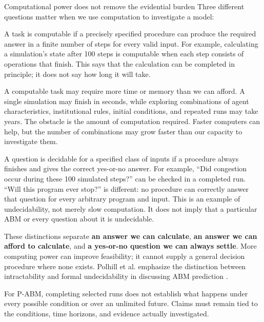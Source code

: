 \documentclass[11pt,a4paper]{article}
\begin{document}
\begin{principle}{Computational power does not remove the evidential burden}
Three different questions matter when we use computation to investigate a model:

\begin{description}[style=nextline,leftmargin=0pt,itemsep=5pt]
\item[Computability: can a procedure calculate the answer?]
A task is computable if a precisely specified procedure can produce the required answer in a finite number of steps for every valid input. For example, calculating a simulation's state after 100 steps is computable when each step consists of operations that finish. This says that the calculation can be completed in principle; it does not say how long it will take.

\item[Tractability: can we obtain the answer with feasible resources?]
A computable task may require more time or memory than we can afford. A single simulation may finish in seconds, while exploring combinations of agent characteristics, institutional rules, initial conditions, and repeated runs may take years. The obstacle is the amount of computation required. Faster computers can help, but the number of combinations may grow faster than our capacity to investigate them.

\item[Decidability: can a procedure always settle a yes-or-no question?]
A question is decidable for a specified class of inputs if a procedure always finishes and gives the correct yes-or-no answer. For example, ``Did congestion occur during these 100 simulated steps?'' can be checked in a completed run. ``Will this program ever stop?'' is different: no procedure can correctly answer that question for every arbitrary program and input. This is an example of undecidability, not merely slow computation. It does not imply that a particular ABM or every question about it is undecidable.
\end{description}

These distinctions separate \textbf{an answer we can calculate}, \textbf{an answer we can afford to calculate}, and \textbf{a yes-or-no question we can always settle}. More computing power can improve feasibility; it cannot supply a general decision procedure where none exists. Polhill et al. emphasize the distinction between intractability and formal undecidability in discussing ABM prediction \cite{polhill_prediction_2021}.

For P-ABM, completing selected runs does not establish what happens under every possible condition or over an unlimited future. Claims must remain tied to the conditions, time horizons, and evidence actually investigated.
\end{principle}
\end{document}
